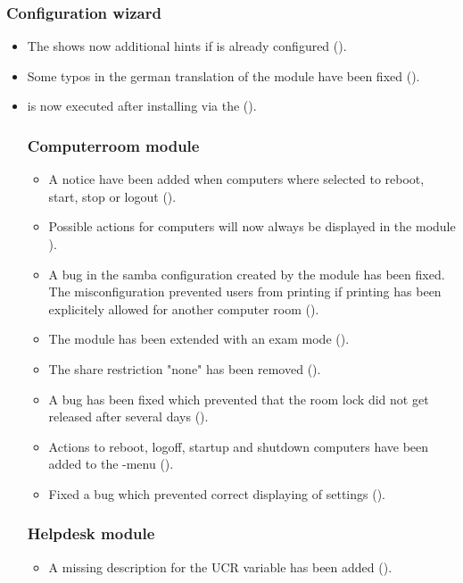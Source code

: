 \subsubsection{Configuration wizard}
\begin{itemize}
\item The  shows now additional hints if  is already configured ().
\item Some typos in the german translation of the  module have been fixed ().
\item {} is now executed after installing  via the  ().
\begin{itemize}

\subsubsection{Computerroom module}
\begin{itemize}
\item A notice have been added when computers where selected to reboot, start, stop or logout ().
\item Possible actions for computers will now always be displayed in the  module ).
\item A bug in the samba configuration created by the  module has been fixed. The
  misconfiguration prevented users from printing if printing has been explicitely allowed for another computer
  room ().
\item The  module has been extended with an exam mode ().
\item The share restriction "none" has been removed ().
\item A bug has been fixed which prevented that the room lock did not get released after several days ().
\item Actions to reboot, logoff, startup and shutdown computers have been added to the -menu ().
\item Fixed a bug which prevented correct displaying of  settings ().
\end{itemize}

\subsubsection{Helpdesk module}
\begin{itemize}
\item A missing description for the UCR variable  has been added ().
\end{itemize}



\end{itemize}
\end{itemize}
